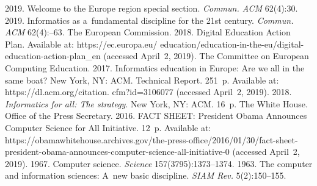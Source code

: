    






  \begin{multicols}{2}

\renewcommand{\bibname}{\protect\rmfamily References}

{\small\frenchspacing
 {%
 \begin{thebibliography}{99}
 2019. Welcome to the Europe region special 
section. \textit{Commun. ACM} 62(4):30.
 2019. 
Informatics as a~fundamental discipline for the 21st century. \textit{Commun. 
ACM}  62(4):--63. 
The European Commission. 2018. Digital Education Action Plan. Available at: {\sf 
https://ec.europa.eu/ education/education-in-the-eu/digital-education-action-plan\_en} 
(accessed April~2, 2019). 
The Committee on European Computing Education. 2017. Informatics education in 
Europe: Are we all in the same boat?  New York, NY: ACM.  Technical Report. 251~p.
Available at: {\sf  https://dl.acm.org/citation. cfm?id=3106077} (accessed April~2, 
2019).
 2018. 
\textit{Informatics for all: The strategy}. New York, NY: ACM. 16~p.
The White House. Office of the Press Secretary. 2016. FACT SHEET: President 
Obama Announces Computer Science for All Initiative. 12~p. Available at: {\sf 
https://obamawhitehouse.archives.gov/the-press-\linebreak office/2016/01/30/fact-sheet-president-obama-announces-computer-science-all-initiative-0} 
(accessed April~2, 2019).
 1967. Computer science. 
\textit{Science} 157(3795):1373--1374.
 1963. The computer and information sciences: A~new basic 
discipline. \textit{SIAM Rev.} 5(2):150--155.

\end{thebibliography}}}
\end{multicols}
